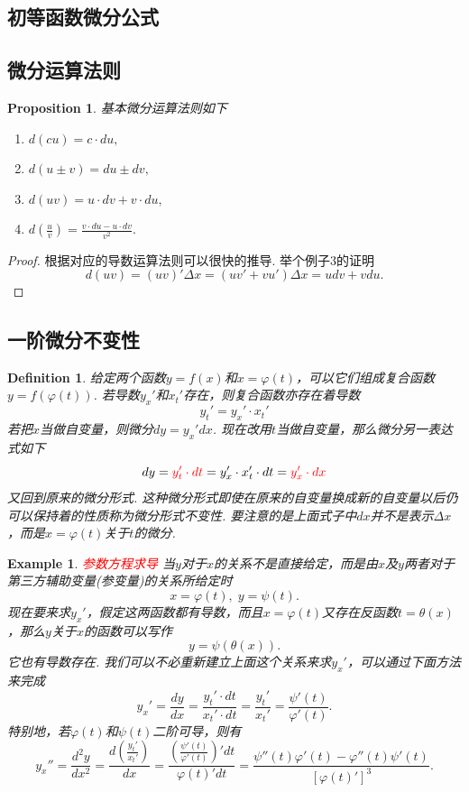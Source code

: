 \documentclass{article}
\newtheorem{proposition}[theorem]{Proposition}
\newtheorem{example}[theorem]{Example}
\newtheorem{definition}[theorem]{Definition}
\newcommand{\redt}[1]{\textcolor{red}{#1}}
\begin{document}
\subsection{初等函数微分公式}


\subsection{微分运算法则}

\begin{proposition}
\rm 基本{\color{red}微分运算法则}如下
\begin{enumerate}
	\item $d(cu) = c\cdot du,$
	\item $d(u\pm v)= du \pm dv,$
	\item $d(uv) = u\cdot dv + v\cdot du,$
	\item $d(\frac{u}{v}) = \frac{v\cdot du - u \cdot dv}{v^2}.$
\end{enumerate}
\end{proposition}

\begin{proof}
{\color{blue}根据对应的导数运算法则可以很快的推导}. 举个例子3的证明
$$
d(uv) = (uv)'\Delta x = (uv'+vu')\Delta x = udv + vdu.
$$
\end{proof}

\subsection{一阶微分不变性}

\begin{definition}
\rm 给定两个函数$y = f(x)$和$x = \varphi(t)$，可以它们组成复合函数$y = f(\varphi(t))$. 若导数$y_x'$和$x_t'$存在，则复合函数亦存在着导数
$$
y_t' = y_x' \cdot x_t'
$$
若把$x$当做自变量，则微分$dy = y_x'dx$. 现在改用$t$当做自变量，那么微分另一表达式如下
$$
dy = {\color{red}y_t' \cdot dt} = y_x' \cdot x_t' \cdot dt = {\color{red}y_x' \cdot dx}
$$
又回到原来的微分形式. 这种微分形式即使在原来的自变量换成新的自变量以后仍可以保持着的性质称为{\color{red}微分形式不变性}. {\color{blue}要注意的是上面式子中$dx$并不是表示$\Delta x$，而是$x=\varphi(t)$关于$t$的微分}.
\end{definition}

\begin{example}
\rm \redt{参数方程求导} 当$y$对于$x$的关系不是直接给定，而是由$x$及$y$两者对于第三方辅助变量(参变量)的关系所给定时
$$
x = \varphi(t), \; y=\psi(t).
$$
现在要来求$y_x'$，假定这两函数都有导数，而且$x=\varphi(t)$又存在反函数$t = \theta(x)$，那么$y$关于$x$的函数可以写作
$$
y = \psi(\theta(x)).
$$
它也有导数存在. 我们可以不必重新建立上面这个关系来求$y_x'$，可以通过下面方法来完成
$$
y_x' = \frac{dy}{dx} = \frac{y_t' \cdot dt}{x_t' \cdot dt} = \frac{y_t'}{x_t'} = \frac{\psi'(t)
}{\varphi'(t)}. 
$$
特别地，若$\varphi(t)$和$\psi(t)$二阶可导，则有
$$
y_x'' = \frac{d^2y}{dx^2}  = \frac{d\left(\frac{y_t'}{x_t'}\right)}{dx} = \frac{\left(\frac{\psi'(t)
}{\varphi'(t)}\right)'dt}{\varphi(t)'dt} = \frac{\psi''(t)\varphi'(t)-\varphi''(t)\psi'(t)}{[\varphi(t)']^3}.
$$
\end{example}
\end{document}
